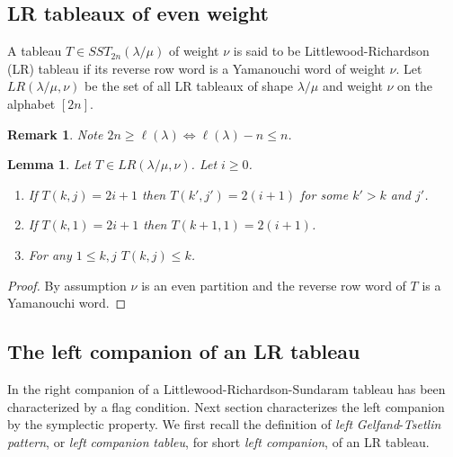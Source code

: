 \documentclass[reqno]{amsart}
\theoremstyle{tplain}
\newtheorem{lem}{Lemma}
\newtheorem{obs}{Remark}
\begin{document}
{\subsection{LR tableaux of even weight}
A tableau $T \in  SST_{2n}(\lambda/\mu)$ of weight $\nu$ is said to be
 Littlewood-Richardson (LR) tableau if its reverse row word is a Yamanouchi word of weight $\nu$.
Let $LR(\lambda/\mu,\nu)$ be the set of all LR tableaux of shape $\lambda/\mu$ and weight $\nu$ on the alphabet $[2n]$.

\begin{obs}Note $2n\ge \ell(\lambda)\Leftrightarrow \ell(\lambda)-n\le n$.
\end{obs}
\begin{lem} Let $T\in LR(\lambda/\mu,\nu)$. Let $i\ge 0$.
\begin{enumerate}
\item If $T(k,j)=2i+1$ then $T(k',j')=2(i+1)$ for some $k'>k$ and $j'$.
\item If $T(k,1)=2i+1$ then $T(k+1,1)=2(i+1)$.
\item  For any $1\le k,j$ $T(k,j)\le k$.
\end{enumerate}
\end{lem}

\begin{proof}By assumption $\nu$ is an even partition and the reverse row word  of $T$ is a Yamanouchi word.
\end{proof}

\subsection{The left companion of an LR tableau}
In \cite{sathishtorres} the right companion of a Littlewood-Richardson-Sundaram tableau has been characterized by a flag condition.
Next section characterizes  the left companion by the symplectic property. We  first recall the definition of   \emph{left} \emph{Gelfand}-\emph{Tsetlin} \emph{pattern}, or  \emph{left} \emph{companion} \emph{tableu},  for short \emph{left companion}, of an LR tableau.



}
\end{document}
